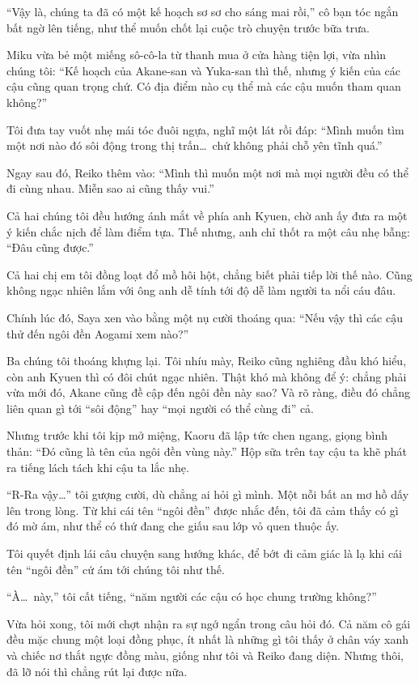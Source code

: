 \documentclass[../main.tex]{subfiles}
\begin{document}
``Vậy là, chúng ta đã có một kế hoạch sơ sơ cho sáng mai rồi,'' cô bạn tóc ngắn bất ngờ lên tiếng, như thể muốn chốt lại cuộc trò chuyện trước bữa trưa.

Miku vừa bẻ một miếng sô-cô-la từ thanh mua ở cửa hàng tiện lợi, vừa nhìn chúng tôi: ``Kế hoạch của Akane-san và Yuka-san thì thế, nhưng ý kiến của các cậu cũng quan trọng chứ. Có địa điểm nào cụ thể mà các cậu muốn tham quan không?''

Tôi đưa tay vuốt nhẹ mái tóc đuôi ngựa, nghĩ một lát rồi đáp: ``Mình muốn tìm một nơi nào đó sôi động trong thị trấn\dots\ chứ không phải chỗ yên tĩnh quá.''

Ngay sau đó, Reiko thêm vào: ``Mình thì muốn một nơi mà mọi người đều có thể đi cùng nhau. Miễn sao ai cũng thấy vui.''

Cả hai chúng tôi đều hướng ánh mắt về phía anh Kyuen, chờ anh ấy đưa ra một ý kiến chắc nịch để làm điểm tựa. Thế nhưng, anh chỉ thốt ra một câu nhẹ bẫng: ``Đâu cũng được.''

Cả hai chị em tôi đồng loạt đổ mồ hôi hột, chẳng biết phải tiếp lời thế nào. Cũng không ngạc nhiên lắm với ông anh dễ tính tới độ dễ làm người ta nổi cáu đâu.

Chính lúc đó, Saya xen vào bằng một nụ cười thoáng qua: ``Nếu vậy thì các cậu thử đến ngôi đền Aogami xem nào?''


Ba chúng tôi thoáng khựng lại. Tôi nhíu mày, Reiko cũng nghiêng đầu khó hiểu, còn anh Kyuen thì có đôi chút ngạc nhiên. Thật khó mà không để ý: chẳng phải vừa mới đó, Akane cũng đề cập đến ngôi đền này sao? Và rõ ràng, điều đó chẳng liên quan gì tới ``sôi động'' hay ``mọi người có thể cùng đi'' cả.

Nhưng trước khi tôi kịp mở miệng, Kaoru đã lập tức chen ngang, giọng bình thản: ``Đó cũng là tên của ngôi đền vùng này.'' Hộp sữa trên tay cậu ta khẽ phát ra tiếng lách tách khi cậu ta lắc nhẹ.

``R-Ra vậy\dots'' tôi gượng cười, dù chẳng ai hỏi gì mình. Một nỗi bất an mơ hồ dấy lên trong lòng. Từ khi cái tên ``ngôi đền'' được nhắc đến, tôi đã cảm thấy có gì đó mờ ám, như thể có thứ đang che giấu sau lớp vỏ quen thuộc ấy.

Tôi quyết định lái câu chuyện sang hướng khác, để bớt đi cảm giác là lạ khi cái tên ``ngôi đền'' cứ ám tới chúng tôi như thế.

``À\dots\ này,'' tôi cất tiếng, ``năm người các cậu có học chung trường không?''

Vừa hỏi xong, tôi mới chợt nhận ra sự ngớ ngẩn trong câu hỏi đó. Cả năm cô gái đều mặc chung một loại đồng phục, ít nhất là những gì tôi thấy ở chân váy xanh và chiếc nơ thắt ngực đồng màu, giống như tôi và Reiko đang diện. Nhưng thôi, đã lỡ nói thì chẳng rút lại được nữa.
\end{document}
